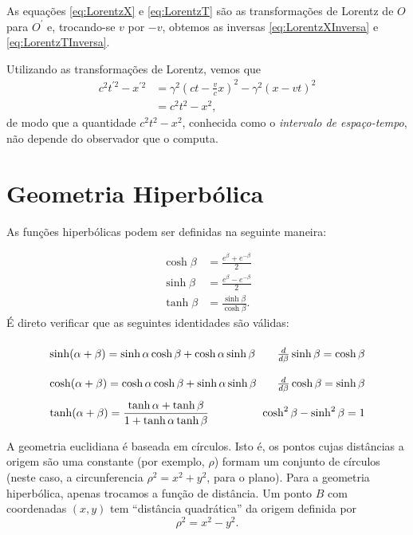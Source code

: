As equações \eqref{eq:LorentzX} e \eqref{eq:LorentzT} são as transformações de Lorentz de $O$ para $O^\prime$ e, trocando-se $v$ por $-v$, obtemos as inversas \eqref{eq:LorentzXInversa} e \eqref{eq:LorentzTInversa}.

Utilizando as transformações de Lorentz, vemos que
\begin{equation}\label{eq:Intervalo}
\begin{aligned} c^{2} t^{\prime 2} -x^{\prime2} &=\gamma^{2}\left(c t-\frac{v}{c} x\right)^{2}-\gamma^{2}(x-v t)^{2} \\ &=c^{2} t^{2}-x^{2} ,\end{aligned}
\end{equation}
de modo que a quantidade $c^2t^2-x^2$, conhecida como o \textit{intervalo de espaço-tempo}, não depende do observador que o computa.

\section{Geometria Hiperbólica}\label{sec:GeometriaHiperbolica}

As funções hiperbólicas podem ser definidas na seguinte maneira:

\begin{equation}\label{eq:FuncoesHiperbolicas}
\begin{aligned} \cosh \beta &=\frac{e^{\beta}+e^{-\beta}}{2} \\ \sinh \beta &=\frac{e^{\beta}-e^{-\beta}}{2} \\ \tanh \beta &=\frac{\sinh \beta}{\cosh \beta } .\end{aligned}
\end{equation}
É direto verificar que as seguintes identidades são válidas:
\begin{equation}\label{eq:IdentidadesFuncoesHiperbolicas}
\arraycolsep=1.4pt\def\arraystretch{2.2}
\begin{array}{lr}
{\sinh (\alpha+\beta)=\sinh \alpha \cosh \beta+\cosh \alpha \sinh \beta \;} & {\frac{d}{d \beta} \sinh \beta=\cosh \beta} \\
{\cosh (\alpha+\beta)=\cosh \alpha \cosh \beta+\sinh \alpha \sinh \beta \;} & {\frac{d}{d \beta} \cosh \beta=\sinh \beta} \\
{\tanh (\alpha+\beta)=\dfrac{\tanh \alpha+\tanh \beta}{1+\tanh \alpha \tanh \beta}} & {\cosh ^{2} \beta-\sinh ^{2} \beta=1  }
\end{array}
\end{equation}

A geometria euclidiana é baseada em círculos. Isto é, os pontos cujas distâncias a origem são uma constante (por exemplo, $\rho$) formam um conjunto de círculos (neste caso, a circunferencia $\rho^2=x^2+y^2$, para o plano). Para a geometria hiperbólica, apenas trocamos a função de distância. Um ponto $B$ com coordenadas $(x,y)$ tem ``distância quadrática'' da origem definida por
\begin{equation}\label{eq:DistanciaHiperbolica}
    \rho^2=x^2-y^2 .
\end{equation}


